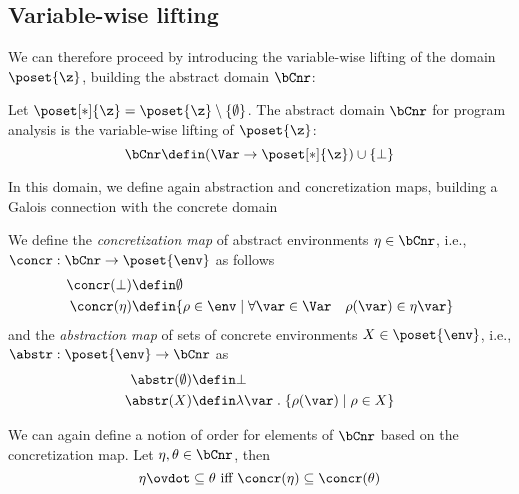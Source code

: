 \subsection{Variable-wise lifting}\label{sub:vwnonrel}

We can therefore proceed by introducing the variable-wise lifting of
the domain \(\poset{\z}\), building the abstract domain \(\bCnr\):

\begin{definition}
  Let \(\poset[*]{\z} = \poset{\z} \setminus \{\emptyset\}\). The
  abstract domain \(\bCnr\) for program analysis is the variable-wise
  lifting of \(\poset{\z}\):
  \[ \bCnr \defin (\Var \to \poset[*]{\z}) \cup \{ \bot \} \]
\end{definition}

In this domain, we define again abstraction and concretization maps,
building a Galois connection with the concrete domain

\begin{definition}\label{def:vwgalios}
  We define the \emph{concretization map} of abstract environments
  \(\eta \in \bCnr\), i.e., \({\concr : \bCnr \to \poset{\env}}\) as
  follows
  \begin{align*}
    \concr(\bot) & \defin \emptyset \\
    \concr(\eta) & \defin \{\rho \in \env \mid \forall \var \in \Var \quad \rho(\var) \in \eta\var\}
  \end{align*}
  and the \emph{abstraction map} of sets of concrete environments
  \(X \in \poset{\env}\), i.e., \(\abstr : \poset{\env} \to \bCnr\) as
  \begin{align*}
    \abstr(\emptyset) & \defin \bot \\
    \abstr(X) & \defin \lambda \var \; . \; \{\rho(\var) \mid \rho \in X\}
  \end{align*}
\end{definition}

We can again define a notion of order for elements of \(\bCnr\) based
on the concretization map. Let \(\eta, \theta \in \bCnr\), then
\begin{equation*}
  \eta \ovdot\subseteq \theta \text{ iff } \concr(\eta) \subseteq \concr(\theta)
\end{equation*}

